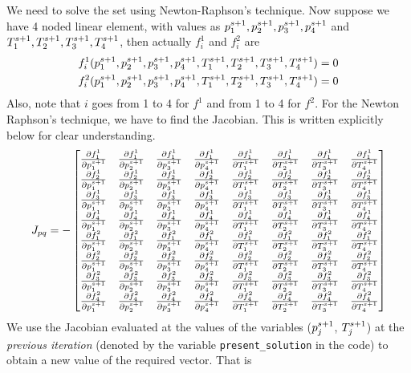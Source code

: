 \documentclass[preprint,12pt]{elsarticle}
\numberwithin{equation}{section}
\begin{document}
We need to solve the set  using Newton-Raphson's technique. Now suppose we have 4 noded linear element, with values as $p_1^{\ts},p_2^{\ts},p_3^{\ts},p_4^{\ts}$ and $T_1^{\ts},T_2^{\ts},T_3^{\ts},T_4^{\ts}$, then actually $f_i^1$ and $f_i^2$ are 
\begin{eqnarray}
	f_i^1(p_1^{\ts},p_2^{\ts},p_3^{\ts},p_4^{\ts},T_1^{\ts},T_2^{\ts},T_3^{\ts},T_4^{\ts})=0 \\
	f_i^2(p_1^{\ts},p_2^{\ts},p_3^{\ts},p_4^{\ts},T_1^{\ts},T_2^{\ts},T_3^{\ts},T_4^{\ts})=0
\end{eqnarray}
Also, note that $i$ goes from 1 to 4 for $f^1$ and from 1 to 4 for $f^2$. For the Newton Raphson's technique, we have to find the Jacobian. This is written explicitly below for clear understanding. 
\begin{equation}
	J_{pq}=-
	\begin{bmatrix}
		\JPP{1}{1} & \JPP{1}{2} & \JPP{1}{3} & \JPP{1}{4} & \JPT{1}{1} & \JPT{1}{2}&\JPT{1}{3}&\JPT{1}{4}\\
		
		\JPP{2}{1} & \JPP{2}{2} & \JPP{2}{3} & \JPP{2}{4} & \JPT{2}{1} & \JPT{2}{2}&\JPT{2}{3}&\JPT{2}{4}\\
		
		\JPP{3}{1} & \JPP{3}{2} & \JPP{3}{3} & \JPP{3}{4} & \JPT{3}{1} & \JPT{3}{2}&\JPT{3}{3}&\JPT{3}{4}\\
		
		\JPP{4}{1} & \JPP{4}{2} & \JPP{4}{3} & \JPP{4}{4} & \JPT{4}{1} & \JPT{4}{2}&\JPT{4}{3}&\JPT{4}{4}\\
		\JTP{1}{1} & \JTP{1}{2} & \JTP{1}{3} & \JTP{1}{4} & \JTT{1}{1} & \JTT{1}{2}&\JTT{1}{3}&\JTT{1}{4}\\
		
		\JTP{2}{1} & \JTP{2}{2} & \JTP{2}{3} & \JTP{2}{4} & \JTT{2}{1} & \JTT{2}{2}&\JTT{2}{3}&\JTT{2}{4}\\
		
		\JTP{3}{1} & \JTP{3}{2} & \JTP{3}{3} & \JTP{3}{4} & \JTT{3}{1} & \JTT{3}{2}&\JTT{3}{3}&\JTT{3}{4}\\
		
		\JTP{4}{1} & \JTP{4}{2} & \JTP{4}{3} & \JTP{4}{4} & \JTT{4}{1} & \JTT{4}{2}&\JTT{4}{3}&\JTT{4}{4}
	\end{bmatrix}
\end{equation}
We use the Jacobian evaluated at the values of the variables ($p_j^{\ts}$, $T_j^{\ts}$) at the \textit{previous iteration} (denoted by the variable \lstinline{present_solution} in the code) to obtain a new value of the required vector. That is
\end{document}
